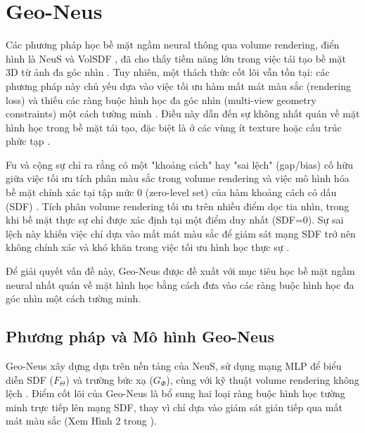 \section{Geo-Neus}
Các phương pháp học bề mặt ngầm neural thông qua volume rendering, điển hình là NeuS \cite{Wang2021NeuS} và VolSDF \cite{Yariv2021VolSDF}, đã cho thấy tiềm năng lớn trong việc tái tạo bề mặt 3D từ ảnh đa góc nhìn \cite{Fu2022GeoNeus_source_1}. Tuy nhiên, một thách thức cốt lõi vẫn tồn tại: các phương pháp này chủ yếu dựa vào việc tối ưu hàm mất mát màu sắc (rendering loss) và thiếu các ràng buộc hình học đa góc nhìn (multi-view geometry constraints) một cách tường minh \cite{Fu2022GeoNeus_source_2, Fu2022GeoNeus_source_15, Fu2022GeoNeus_source_33}. Điều này dẫn đến sự không nhất quán về mặt hình học trong bề mặt tái tạo, đặc biệt là ở các vùng ít texture hoặc cấu trúc phức tạp \cite{Fu2022GeoNeus_source_2, Fu2022GeoNeus_source_16}.

Fu và cộng sự \cite{Fu2022GeoNeus} chỉ ra rằng có một "khoảng cách" hay "sai lệch" (gap/bias) cố hữu giữa việc tối ưu tích phân màu sắc trong volume rendering và việc mô hình hóa bề mặt chính xác tại tập mức 0 (zero-level set) của hàm khoảng cách có dấu (SDF) \cite{Fu2022GeoNeus_source_4, Fu2022GeoNeus_source_18, Fu2022GeoNeus_source_19, Fu2022GeoNeus_source_68, Fu2022GeoNeus_source_81, Fu2022GeoNeus_source_87}. Tích phân volume rendering tối ưu trên nhiều điểm dọc tia nhìn, trong khi bề mặt thực sự chỉ được xác định tại một điểm duy nhất (SDF=0). Sự sai lệch này khiến việc chỉ dựa vào mất mát màu sắc để giám sát mạng SDF trở nên không chính xác và khó khăn trong việc tối ưu hình học thực sự \cite{Fu2022GeoNeus_source_24, Fu2022GeoNeus_source_88}.

Để giải quyết vấn đề này, Geo-Neus \cite{Fu2022GeoNeus} được đề xuất với mục tiêu học bề mặt ngầm neural nhất quán về mặt hình học bằng cách đưa vào các ràng buộc hình học đa góc nhìn một cách tường minh.

\subsection{Phương pháp và Mô hình Geo-Neus}

Geo-Neus xây dựng dựa trên nền tảng của NeuS, sử dụng mạng MLP để biểu diễn SDF ($F_\Theta$) và trường bức xạ ($G_\Phi$), cùng với kỹ thuật volume rendering không lệch \cite{Fu2022GeoNeus_source_66, Fu2022GeoNeus_source_78}. Điểm cốt lõi của Geo-Neus là bổ sung hai loại ràng buộc hình học tường minh trực tiếp lên mạng SDF, thay vì chỉ dựa vào giám sát gián tiếp qua mất mát màu sắc \cite{Fu2022GeoNeus_source_3, Fu2022GeoNeus_source_29, Fu2022GeoNeus_source_37, Fu2022GeoNeus_source_90, Fu2022GeoNeus_source_91} (Xem Hình 2 trong \cite{Fu2022GeoNeus}).

